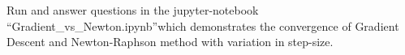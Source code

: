\rm{}

Run and answer questions in the jupyter-notebook \textquotedblleft Gradient\_vs\_Newton.ipynb\textquotedblright which demonstrates the convergence of Gradient Descent and Newton-Raphson method with variation in step-size.

\sol{
    
}